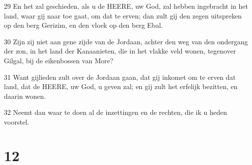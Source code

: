 \par 29 En het zal geschieden, als u de HEERE, uw God, zal hebben ingebracht in het land, waar gij naar toe gaat, om dat te erven; dan zult gij den zegen uitspreken op den berg Gerizim, en den vloek op den berg Ebal.
\par 30 Zijn zij niet aan gene zijde van de Jordaan, achter den weg van den ondergang der zon, in het land der Kanaanieten, die in het vlakke veld wonen, tegenover Gilgal, bij de eikenbossen van More?
\par 31 Want gijlieden zult over de Jordaan gaan, dat gij inkomet om te erven dat land, dat de HEERE, uw God, u geven zal; en gij zult het erfelijk bezitten, en daarin wonen.
\par 32 Neemt dan waar te doen al de inzettingen en de rechten, die ik u heden voorstel.

\chapter{12}

